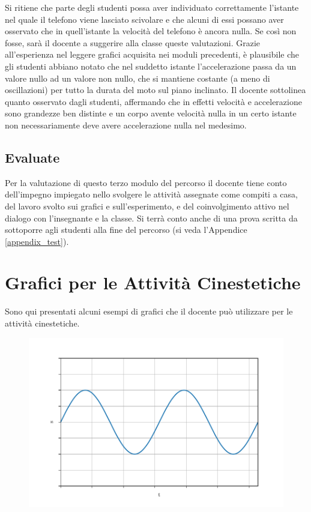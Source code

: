 \documentclass{report} \usepackage[T1]{fontenc} \usepackage[italian]{babel}
\begin{document}
Si ritiene che parte degli studenti possa aver individuato
correttamente l'istante nel quale il telefono viene lasciato
scivolare e che alcuni di essi possano aver osservato che in quell'istante
la velocità del telefono è ancora nulla. Se così non fosse, sarà il
docente a suggerire alla classe queste valutazioni.
Grazie all'esperienza nel leggere grafici acquisita nei moduli precedenti,
è plausibile che gli studenti abbiano notato che nel suddetto istante
l'accelerazione passa da un valore nullo ad un valore non nullo, che si
mantiene costante (a meno di oscillazioni) per tutto la durata
del moto sul piano inclinato.
Il docente sottolinea quanto osservato dagli studenti, affermando
che in effetti velocità e accelerazione sono grandezze ben distinte
e un corpo avente velocità nulla in un certo istante non necessariamente
deve avere accelerazione nulla nel medesimo.

\section{Evaluate}
Per la valutazione di questo terzo modulo del percorso il docente tiene conto
dell'impegno impiegato nello svolgere le attività assegnate come compiti a casa,
del lavoro svolto sui grafici e sull'esperimento, e del coinvolgimento attivo
nel dialogo con l'insegnante e la classe.
Si terrà conto anche di una prova scritta da sottoporre agli
studenti alla fine del percorso
(si veda l'Appendice \ref{appendix_test}).

\appendix
\chapter{Grafici per le Attività Cinestetiche}\label{appendix_kine}
Sono qui presentati alcuni esempi di grafici che il docente può
utilizzare per le attività cinestetiche.

\begin{figure}[H]
\centering
  \includegraphics[width=\textwidth]{kine_plot4}
  \label{fig:kine_plot4}
\end{figure}
\end{document}
